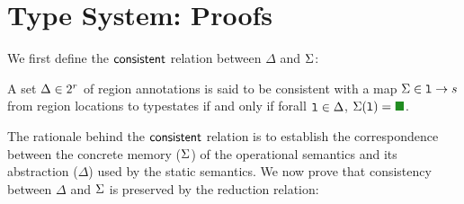 \section{Type System: Proofs}

We first define the ${\sf consistent}$ relation between $\Delta$ and
$\mem$:

\begin{definition}[\consistent($\Delta$,$\mem$)]
A set $\Delta \in 2^{r}$ of region annotations is said to be
consistent with a map $\Sigma \in \mathtt{l} \rightarrow s$ from region
locations to typestates if and only if forall $\mathtt{l}\in\Delta$,
$\mem(\loc) = \LIVE$.
\end{definition}

The rationale behind the ${\sf consistent}$ relation is to establish the
correspondence between the concrete memory ($\mem$) of the operational
semantics and its abstraction ($\Delta$) used by the static semantics.
We now prove that consistency between $\Delta$ and $\mem$ is preserved
by the reduction relation:

